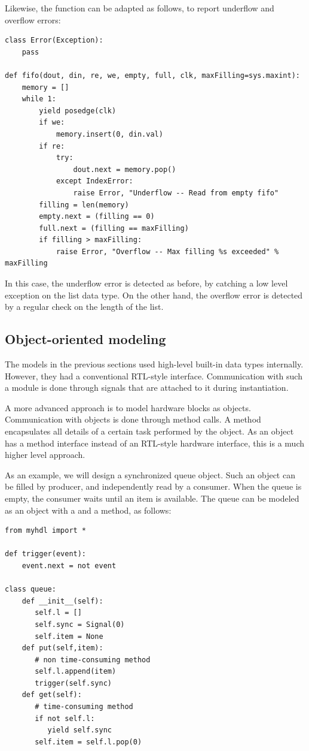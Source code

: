 Likewise, the  function can be adapted as follows, to
report underflow and overflow errors:

\begin{verbatim}
class Error(Exception):
    pass

def fifo(dout, din, re, we, empty, full, clk, maxFilling=sys.maxint):
    memory = []
    while 1:
        yield posedge(clk)
        if we:
            memory.insert(0, din.val)
        if re:
            try:
                dout.next = memory.pop()
            except IndexError:
                raise Error, "Underflow -- Read from empty fifo"
        filling = len(memory)
        empty.next = (filling == 0)
        full.next = (filling == maxFilling)
        if filling > maxFilling:
            raise Error, "Overflow -- Max filling %s exceeded" % maxFilling
\end{verbatim}

In this case, the underflow error is detected as before, by catching a
low level exception on the list data type. On the other hand, the
overflow error is detected by a regular check on the length of the
list.


\subsection{Object-oriented modeling \label{model-obj}}

The models in the previous sections used high-level built-in data
types internally. However, they had a conventional RTL-style
interface.  Communication with such a module is done through signals
that are attached to it during instantiation.

A more advanced approach is to model hardware blocks as
objects. Communication with objects is done through method calls.
A method encapsulates all details of a certain task performed
by the object. As an object has a method interface instead
of an RTL-style hardware interface, this is a much 
higher level approach.

As an example, we will design a synchronized queue object. 
Such an object can be filled by producer, and independently
read by a consumer. When the queue is empty, the consumer
waits until an item is available. The queue can be modeled
as an object with a  and a 
method, as follows:

\begin{verbatim}
from myhdl import *

def trigger(event):
    event.next = not event

class queue:
    def __init__(self):
       self.l = []
       self.sync = Signal(0)
       self.item = None
    def put(self,item):
       # non time-consuming method
       self.l.append(item)
       trigger(self.sync)
    def get(self):
       # time-consuming method
       if not self.l:
          yield self.sync
       self.item = self.l.pop(0)
\end{verbatim}

